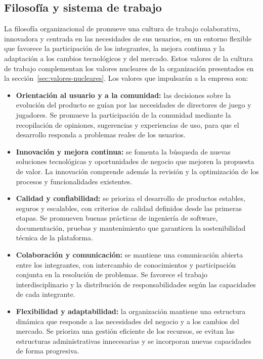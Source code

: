 \subsection{Filosofía y sistema de trabajo}
La filosofía organizacional de \nombreproyecto{} promueve una cultura de trabajo colaborativa, innovadora y centrada en las necesidades de sus usuarios, en un entorno flexible que favorece la participación de los integrantes, la mejora continua y la adaptación a los cambios tecnológicos y del mercado. Estos valores de la cultura de trabajo complementan los valores nucleares de la organización presentados en la sección~\ref{sec:valores-nucleares}. Los valores que impulsarán a la empresa son:
\begin{itemize}
  \item \textbf{Orientación al usuario y a la comunidad:} las decisiones sobre la evolución del producto se guían por las necesidades de directores de juego y jugadores. Se promueve la participación de la comunidad mediante la recopilación de opiniones, sugerencias y experiencias de uso, para que el desarrollo responda a problemas reales de los usuarios.
  \item \textbf{Innovación y mejora continua:} se fomenta la búsqueda de nuevas soluciones tecnológicas y oportunidades de negocio que mejoren la propuesta de valor. La innovación comprende además la revisión y la optimización de los procesos y funcionalidades existentes.
  \item \textbf{Calidad y confiabilidad:} se prioriza el desarrollo de productos estables, seguros y escalables, con criterios de calidad definidos desde las primeras etapas. Se promueven buenas prácticas de ingeniería de software, documentación, pruebas y mantenimiento que garanticen la sostenibilidad técnica de la plataforma.
  \item \textbf{Colaboración y comunicación:} se mantiene una comunicación abierta entre los integrantes, con intercambio de conocimientos y participación conjunta en la resolución de problemas. Se favorece el trabajo interdisciplinario y la distribución de responsabilidades según las capacidades de cada integrante.
  \item \textbf{Flexibilidad y adaptabilidad:} la organización mantiene una estructura dinámica que responde a las necesidades del negocio y a los cambios del mercado. Se prioriza una gestión eficiente de los recursos, se evitan las estructuras administrativas innecesarias y se incorporan nuevas capacidades de forma progresiva.
\end{itemize}

